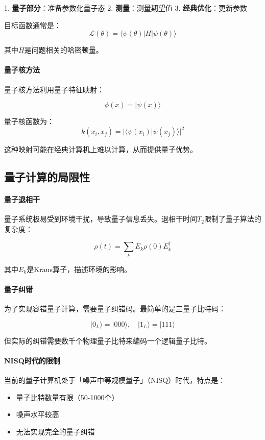 1. \textbf{量子部分}：准备参数化量子态
2. \textbf{测量}：测量期望值
3. \textbf{经典优化}：更新参数

目标函数通常是：
$$\mathcal{L}(\theta) = \langle\psi(\theta)|H|\psi(\theta)\rangle$$

其中$H$是问题相关的哈密顿量。

\paragraph{量子核方法}
量子核方法利用量子特征映射：

$$\phi(x) = |\psi(x)\rangle$$

量子核函数为：
$$k(x_i, x_j) = |\langle\psi(x_i)|\psi(x_j)\rangle|^2$$

这种映射可能在经典计算机上难以计算，从而提供量子优势。

\subsection{量子计算的局限性}

\paragraph{量子退相干}
量子系统极易受到环境干扰，导致量子信息丢失。退相干时间$T_2$限制了量子算法的复杂度：

$$\rho(t) = \sum_k E_k \rho(0) E_k^\dagger$$

其中$E_k$是Kraus算子，描述环境的影响。

\paragraph{量子纠错}
为了实现容错量子计算，需要量子纠错码。最简单的是三量子比特码：

$$|0_L\rangle = |000\rangle, \quad |1_L\rangle = |111\rangle$$

但实际的纠错需要数千个物理量子比特来编码一个逻辑量子比特。

\paragraph{NISQ时代的限制}
当前的量子计算机处于「噪声中等规模量子」（NISQ）时代，特点是：
\begin{itemize}
\item 量子比特数量有限（50-1000个）
\item 噪声水平较高
\item 无法实现完全的量子纠错
\end{itemize}

